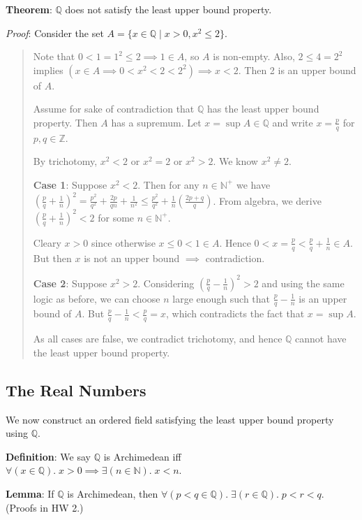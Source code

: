 \documentclass[11pt]{article}
\begin{document}
\textbf{Theorem}: $\mathbb{Q}$ does not satisfy the least upper bound property.

\emph{Proof}: Consider the set $A = \{x \in \mathbb{Q} \mid x > 0, x^2 \leq 2\}$.
\begin{quote}\vspace{-0.3cm}
Note that $0 < 1 = 1^2 \leq 2 \implies 1 \in A$, so $A$ is non-empty. Also, $2 \leq 4 = 2^2$ implies $(x \in A \implies 0 < x^2 < 2 < 2^2) \implies x < 2$. Then 2 is an upper bound of $A$.

Assume for sake of contradiction that $\mathbb{Q}$ has the least upper bound property. Then $A$ has a supremum. Let $x = \sup A \in \mathbb{Q}$ and write $x = \frac{p}{q}$ for $p,q \in \mathbb{Z}$.

By trichotomy, $x^2 < 2$ or $x^2 = 2$ or $x^2 > 2$. We know $x^2 \neq 2$.

\textbf{Case 1}: Suppose $x^2 < 2$. Then for any $n \in \mathbb{N}^+$ we have $(\frac{p}{q} + \frac{1}{n})^2 = \frac{p^2}{q^2} + \frac{2p}{qn} + \frac{1}{n^2} \leq \frac{p^2}{q^2} + \frac{1}{n}(\frac{2p+q}{q})$. From algebra, we derive $(\frac{p}{q} + \frac{1}{n})^2 < 2$ for some $n \in \mathbb{N}^+$.

Cleary $x > 0$ since otherwise $x \leq 0 < 1 \in A$. Hence $0 < x = \frac{p}{q} < \frac{p}{q} + \frac{1}{n} \in A$. But then $x$ is not an upper bound $\implies$ contradiction.

\textbf{Case 2}: Suppose $x^2 > 2$. Considering $(\frac{p}{q} - \frac{1}{n})^2 > 2$ and using the same logic as before, we can choose $n$ large enough such that $\frac{p}{q} - \frac{1}{n}$ is an upper bound of $A$. But $\frac{p}{q} - \frac{1}{n} < \frac{p}{q} = x$, which contradicts the fact that $x = \sup A$.

As all cases are false, we contradict trichotomy, and hence $\mathbb{Q}$ cannot have the least upper bound property.
\end{quote}

\subsection{The Real Numbers}

We now construct an ordered field satisfying the least upper bound property using $\mathbb{Q}$.

\textbf{Definition}: We say $\mathbb{Q}$ is Archimedean iff $\forall (x \in \mathbb{Q}).\; x > 0 \implies \exists (n \in \mathbb{N}).\; x < n$.

\textbf{Lemma}: If $\mathbb{Q}$ is Archimedean, then $\forall (p < q \in \mathbb{Q}).\; \exists (r \in \mathbb{Q}).\; p < r < q$.\\
(Proofs in HW 2.)
\end{document}
